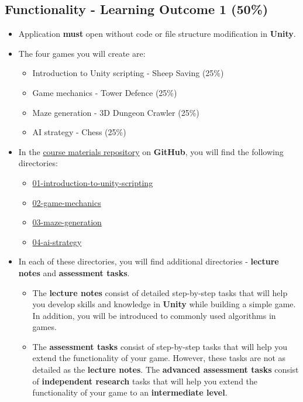 \documentclass{article}
\begin{document}
\subsection*{Functionality - Learning Outcome 1 (50\%)}
\begin{itemize}
	\item Application \textbf{must} open without code or file structure modification in \textbf{Unity}.
	\item The four games you will create are:
	\begin{itemize}
		\item Introduction to Unity scripting - Sheep Saving (25\%)
		\item Game mechanics - Tower Defence (25\%)
		\item Maze generation - 3D Dungeon Crawler (25\%)
		\item AI strategy - Chess (25\%)
	\end{itemize}
	\item In the \href{https://github.com/otago-polytechnic-bit-courses/ID630151-introduction-to-algorithmic-problem-solving}{course materials repository} on \textbf{GitHub}, you will find the following directories:
	\begin{itemize}
		\item \href{https://github.com/otago-polytechnic-bit-courses/ID630151-introduction-to-algorithmic-problem-solving/tree/main/01-introduction-to-unity-scripting}{01-introduction-to-unity-scripting}
		\item \href{https://github.com/otago-polytechnic-bit-courses/ID630151-introduction-to-algorithmic-problem-solving/tree/main/02-game-mechanics}{02-game-mechanics}
		\item \href{https://github.com/otago-polytechnic-bit-courses/ID630151-introduction-to-algorithmic-problem-solving/tree/main/03-maze-generation}{03-maze-generation}
		\item \href{https://github.com/otago-polytechnic-bit-courses/ID630151-introduction-to-algorithmic-problem-solving/tree/main/04-ai-strategy}{04-ai-strategy}
	\end{itemize}
	\item In each of these directories, you will find additional directories - \textbf{lecture notes} and \textbf{assessment tasks}. 
	\begin{itemize}
		\item The \textbf{lecture notes} consist of detailed step-by-step tasks that will help you develop skills and knowledge in \textbf{Unity} while building a simple game. In addition, you will be introduced to commonly used algorithms in games.
		\item The \textbf{assessment tasks} consist of step-by-step tasks that will help you extend the functionality of your game. However, these tasks are not as detailed as the \textbf{lecture notes}. The \textbf{advanced assessment tasks} consist of \textbf{independent research} tasks that will help you extend the functionality of your game to an \textbf{intermediate level}.
	\end{itemize} 
\end{itemize}
\end{document}
